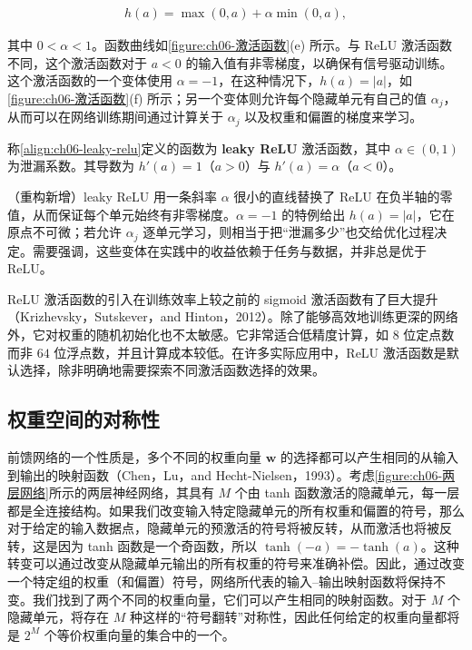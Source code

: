 \documentclass[../../main.tex]{subfiles}
\begin{document}
\begin{align}
h(a)=\max(0,a)+\alpha\min(0,a),
\label{align:ch06-leaky-relu}
\end{align}

其中 $0<\alpha<1$。函数曲线如\cref{figure:ch06-激活函数}(e) 所示。与 ReLU 激活函数不同，这个激活函数对于 $a<0$ 的输入值有非零梯度，以确保有信号驱动训练。这个激活函数的一个变体使用 $\alpha=-1$，在这种情况下，$h(a)=|a|$，如\cref{figure:ch06-激活函数}(f) 所示；另一个变体则允许每个隐藏单元有自己的值 $\alpha_j$，从而可以在网络训练期间通过计算关于 $\alpha_j$ 以及权重和偏置的梯度来学习。

\begin{definition}\label{definition:ch06-leaky-ReLU}
称\eqref{align:ch06-leaky-relu}定义的函数为 \textbf{leaky ReLU} 激活函数，其中 $\alpha\in(0,1)$ 为泄漏系数。其导数为 $h'(a)=1$（$a>0$）与 $h'(a)=\alpha$（$a<0$）。
\end{definition}

\begin{remark}（重构新增）leaky ReLU 用一条斜率 $\alpha$ 很小的直线替换了 ReLU 在负半轴的零值，从而保证每个单元始终有非零梯度。$\alpha=-1$ 的特例给出 $h(a)=|a|$，它在原点不可微；若允许 $\alpha_j$ 逐单元学习，则相当于把“泄漏多少”也交给优化过程决定。需要强调，这些变体在实践中的收益依赖于任务与数据，并非总是优于 ReLU。
\end{remark}

ReLU 激活函数的引入在训练效率上较之前的 sigmoid 激活函数有了巨大提升（Krizhevsky，Sutskever，and Hinton，2012）。除了能够高效地训练更深的网络外，它对权重的随机初始化也不太敏感。它非常适合低精度计算，如 $8$ 位定点数而非 $64$ 位浮点数，并且计算成本较低。在许多实际应用中，ReLU 激活函数是默认选择，除非明确地需要探索不同激活函数选择的效果。

\subsection{权重空间的对称性}\label{subsection:ch06-权重空间的对称性}

前馈网络的一个性质是，多个不同的权重向量 $\boldsymbol{w}$ 的选择都可以产生相同的从输入到输出的映射函数（Chen，Lu，and Hecht-Nielsen，1993）。考虑\cref{figure:ch06-两层网络}所示的两层神经网络，其具有 $M$ 个由 tanh 函数激活的隐藏单元，每一层都是全连接结构。如果我们改变输入特定隐藏单元的所有权重和偏置的符号，那么对于给定的输入数据点，隐藏单元的预激活的符号将被反转，从而激活也将被反转，这是因为 tanh 函数是一个奇函数，所以 $\tanh(-a)=-\tanh(a)$。这种转变可以通过改变从隐藏单元输出的所有权重的符号来准确补偿。因此，通过改变一个特定组的权重（和偏置）符号，网络所代表的输入--输出映射函数将保持不变。我们找到了两个不同的权重向量，它们可以产生相同的映射函数。对于 $M$ 个隐藏单元，将存在 $M$ 种这样的“符号翻转”对称性，因此任何给定的权重向量都将是 $2^{M}$ 个等价权重向量的集合中的一个。
\end{document}
